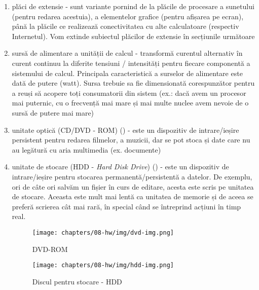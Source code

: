 \begin{enumerate}
	\item plăci de extensie - sunt variante pornind de la plăcile de
		procesare a sunetului (pentru redarea acestuia), a elementelor
		grafice (pentru afișarea pe ecran), până la plăcile ce realizează
		conectivitatea cu alte calculatoare (respectiv Internetul). Vom
		extinde subiectul plăcilor de extensie în secțiunile următoare
	\item sursă de alimentare a unității de calcul - transformă curentul
		alternativ în curent continuu la diferite tensiuni / intensități
		pentru fiecare componentă a sistemului de calcul. Principala
		caracteristică a surselor de alimentare este dată de putere
		(watt). Sursa trebuie sa fie dimensionată corespunzător pentru a
		reuși să acopere toți consumatorii din sistem (ex.: dacă avem un
		procesor mai puternic, cu o frecvență mai mare și mai multe
		nuclee avem nevoie de o sursă de putere mai mare)
              \item unitate optică (CD/DVD - ROM)  () -
		este un dispozitiv de intrare/ieșire persistent pentru
		redarea filmelor, a muzicii, dar se pot stoca și date care nu au
		legătură cu aria multimedia (ex. documente)

        \item unitate de stocare (HDD  - \textit{Hard Disk
          Drive}) () - este un dispozitiv de intrare/ieșire pentru
		stocarea permanentă/persistentă a datelor. De exemplu, ori de
		câte ori salvăm un fișier în curs de editare, acesta este scris
		pe unitatea de stocare. Aceasta este mult mai lentă ca unitatea
		de memorie și de aceea se preferă scrierea cât mai rară, în
		special când se întreprind acțiuni în timp real.


\begin{figure}[!htbp]
	\centering
	\texttt{[image: chapters/08-hw/img/dvd-img.png]}
	\caption{DVD-ROM\protect\footnotemark}
	\label{fig:hw:dvd}
\end{figure}


\begin{figure}[!htbp]
	\centering
	\texttt{[image: chapters/08-hw/img/hdd-img.png]}
	\caption{Discul pentru stocare - HDD\protect\footnotemark}
	\label{fig:hw:hdd}
\end{figure}


\end{enumerate}
